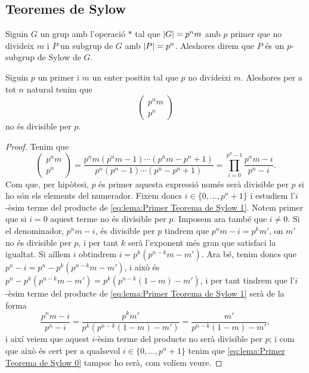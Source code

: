 \documentclass[../Apunts.tex]{subfiles}
\begin{document}
	\subsection{Teoremes de Sylow}
	\begin{definition}
		\label{def:p-subgrup de Sylow}
		Siguin \(G\) un grup amb l'operació \(\ast\) tal que \(\abs{G}=p^{n}m\) amb \(p\) primer que no divideix \(m\) i \(P\) un subgrup de \(G\) amb \(\abs{P}=p^{n}\). Aleshores direm que \(P\) és un \(p\)-subgrup de Sylow de \(G\).
	\end{definition}
	\begin{lemma}
		\label{lema:Primer Teorema de Sylow}
		Siguin \(p\) un primer i \(m\) un enter positiu tal que \(p\) no divideixi \(m\). Aleshores per a tot \(n\) natural tenim que
		\begin{equation}
		\left(\begin{matrix}
		\label{eq:lema:Primer Teorema de Sylow 0}
		p^{n}m\\p^{n}
		\end{matrix}\right)
		\end{equation}
		no és divisible per \(p\).
		\begin{proof}
			Tenim que
			\begin{equation}
		\label{eq:lema:Primer Teorema de Sylow 1}
			\left(\begin{matrix}
			p^{n}m\\p^{n}
			\end{matrix}\right)
			=\frac{p^{n}m(p^{n}m-1)\cdots(p^{n}m-p^{n}+1)}{p^{n}(p^{n}-1)\cdots(p^{n}-p^{n}+1)}=\prod_{i=0}^{p^{n}-1}\frac{p^{n}m-i}{p^{n}-i}.
			\end{equation}
			Com que, per hipòtesi, \(p\) és primer aquesta expressió només serà divisible per \(p\) si ho són els elements del numerador. Fixem doncs \(i\in\{0,\dots,p^{n}+1\}\) i estudiem l'\(i\)-èsim terme del producte de \eqref{eq:lema:Primer Teorema de Sylow 1}. Notem primer que si \(i=0\) aquest terme no és divisible per \(p\). Imposem ara també que \(i\neq0\). Si el denominador, \(p^{n}m-i\), és divisible per \(p\) tindrem que \(p^{n}m-i=p^{k}m'\), on \(m'\) no és divisible per \(p\), i per tant \(k\) serà l'exponent més gran que satisfaci la igualtat. Si aïllem \(i\) obtindrem \(i=p^{k}(p^{n-k}m-m')\). Ara bé, tenim doncs que \(p^{n}-i=p^{n}-p^{k}(p^{n-k}m-m')\), i això és \(p^{n}-p^{k}(p^{n-k}m-m')=p^{k}(p^{n-k}(1-m)-m')\), i per tant tindrem que l'\(i\)-èsim terme del producte de \eqref{eq:lema:Primer Teorema de Sylow 1} serà de la forma
			\[\frac{p^{n}m-i}{p^{n}-i}=\frac{p^{k}m'}{p^{k}(p^{n-k}(1-m)-m')}=\frac{m'}{p^{n-k}(1-m)-m'},\]
			i així veiem que aquest \(i\)-èsim terme del producte no serà divisible per \(p\); i com que això és cert per a qualsevol \(i\in\{0,\dots,p^{n}+1\}\) tenim que \eqref{eq:lema:Primer Teorema de Sylow 0} tampoc ho serà, com volíem veure.
		\end{proof}
	\end{lemma}
\end{document}
